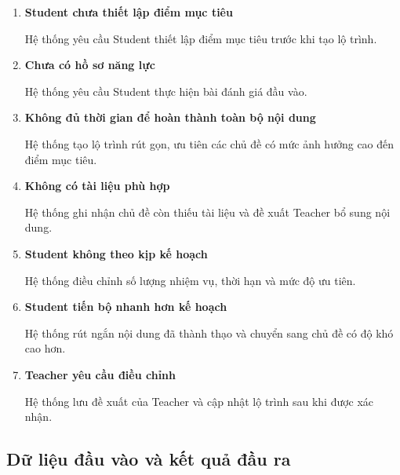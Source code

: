 \begin{enumerate}[label=\textbf{A\arabic*.}]
	\item \textbf{Student chưa thiết lập điểm mục tiêu}
	
	Hệ thống yêu cầu Student thiết lập điểm mục tiêu trước khi tạo lộ
	trình.
	
	\item \textbf{Chưa có hồ sơ năng lực}
	
	Hệ thống yêu cầu Student thực hiện bài đánh giá đầu vào.
	
	\item \textbf{Không đủ thời gian để hoàn thành toàn bộ nội dung}
	
	Hệ thống tạo lộ trình rút gọn, ưu tiên các chủ đề có mức ảnh hưởng cao
	đến điểm mục tiêu.
	
	\item \textbf{Không có tài liệu phù hợp}
	
	Hệ thống ghi nhận chủ đề còn thiếu tài liệu và đề xuất Teacher bổ
	sung nội dung.
	
	\item \textbf{Student không theo kịp kế hoạch}
	
	Hệ thống điều chỉnh số lượng nhiệm vụ, thời hạn và mức độ ưu tiên.
	
	\item \textbf{Student tiến bộ nhanh hơn kế hoạch}
	
	Hệ thống rút ngắn nội dung đã thành thạo và chuyển sang chủ đề có độ
	khó cao hơn.
	
	\item \textbf{Teacher yêu cầu điều chỉnh}
	
	Hệ thống lưu đề xuất của Teacher và cập nhật lộ trình sau khi được
	xác nhận.
\end{enumerate}

\subsection{Dữ liệu đầu vào và kết quả đầu ra}

